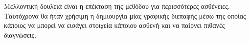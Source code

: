 \documentclass[12pt]{extarticle}
\begin{document}
Μελλοντική δουλειά είναι η επέκταση της μεθόδου για περισσότερες ασθένειες.
Ταυτόχρονα θα ήταν χρήσιμη η δημιουργία μίας γραφικής διεπαφής μέσω 
της οποίας κάποιος να μπορεί να εισάγει στοιχεία κάποιου ασθενή και να παίρνει 
πιθανές διαγνώσεις.

\newpage


\end{document}
